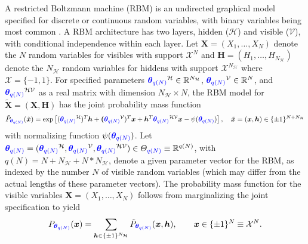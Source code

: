 \documentclass[numbib]{imamat}
\theoremstyle{theorem}
\theoremstyle{lemma}
\theoremstyle{example}
\theoremstyle{corollary}
\theoremstyle{definition}
\theoremstyle{remark}
\theoremstyle{approximation}
\theoremstyle{scheme}
\newcommand{\thetaidx}{q(N)}
\newcommand{\thetaN}{\boldsymbol \theta_{\thetaidx}}
\newcommand{\ak}[1]{{\color{blue} #1}}
\begin{document}
A restricted Boltzmann machine (RBM) is an undirected graphical model specified for discrete or continuous random variables, with binary variables being most common \citep[cf.~][]{smolensky1986information}. A RBM architecture has two layers, hidden (\(\mathcal{H}\)) and visible (\(\mathcal{V}\)), with conditional independence within each layer. Let \(\boldsymbol X = (X_1,\ldots,X_N)\) denote the \(N\) random variables for visibles with support \(\mathcal{X}^N\) and \(\boldsymbol H = (H_1,\ldots,H_{N_\mathcal{H}})\) denote the \(N_\mathcal{H}\) random variables for hiddens with support \(\mathcal{X}^{N_\mathcal{H}}\) where \(\mathcal{X} = \{-1,1\}\). For \ak{specified} parameters \(\ak{\thetaN}^{\mathcal{H}} \in \mathbb{R}^{N_\mathcal{H}}\), \(\ak{\thetaN}^{\mathcal{V}}\in \mathbb{R}^N\), and \(\ak{\thetaN}^{\mathcal{HV}}\) as a real matrix with dimension \(N_\mathcal{H} \times N\), the RBM model for \(\tilde{\boldsymbol X}=(\boldsymbol X,\boldsymbol H)\) has the joint probability mass function
\begin{equation}
\label{eq:RBM1}
\tilde{P}_{\ak{\thetaN}} (\tilde{\boldsymbol x}) = \exp\left[ (\ak{\thetaN}^{\mathcal{H}})^T \boldsymbol h + \boldsymbol (\ak{\thetaN}^{\mathcal{V}})^T \boldsymbol x + \boldsymbol h^T  \ak{\thetaN}^{\mathcal{HV}} \boldsymbol x - \psi(\ak{\thetaN})\right], \quad \tilde{\boldsymbol x} = (\boldsymbol x, \boldsymbol h) \in \{\pm 1\}^{N+N_\mathcal{H}}
\end{equation}
with \ak{normalizing function $\psi(\ak{\thetaN})$}.
Let \(\ak{\thetaN} = (\ak{\thetaN}^{\mathcal{H}}, \ak{\thetaN}^{\mathcal{V}}, \ak{\thetaN}^{\mathcal{HV}} ) \in \Theta_\ak{\thetaidx} \equiv \mathbb{R}^{q(N)}\), with \(q(N) = N + N_\mathcal{H} + N*N_\mathcal{H}\), denote \ak{a given} parameter vector for the RBM, as indexed by the number \(N\) of visible random variables (which may differ from the actual lengths of these parameter vectors). The probability mass function for the visible variables \(\boldsymbol X = (X_1, \dots, X_N)\) follows from marginalizing the joint specification to yield
\begin{equation}
\label{eq:RBM2}
P_{\ak{\thetaN}} (\boldsymbol x) = \sum\limits_{\boldsymbol h \in \{\pm 1\}^{N_{\mathcal{H}}}} \tilde{P}_{\ak{\thetaN}} (\boldsymbol x, \boldsymbol h), \qquad \boldsymbol x \in \{\pm 1\}^{N}\equiv \mathcal{X}^N.
\end{equation}
\end{document}
